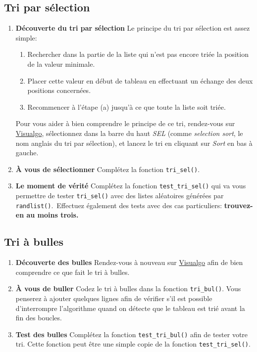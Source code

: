 \documentclass[11pt,a4paper]{article}
\newcommand{\checkbox}{$\square$ \smallskip}
\newcounter{exo} \setcounter{exo}{0}
\newenvironment{action}{%
    \begin{enumerate}[\numerotation] \addtocounter{exo}{-1}%
        }{%
    \end{enumerate}
}
\newcommand{\numexoa}{\theexo \addtocounter{exo}{1}}
\newcommand{\numerotation}{\checkbox \smallskip \numexoa.}
\begin{document}
\subsection*{Tri par sélection}
\begin{action}
\item {\bf Découverte du tri par sélection} Le principe du tri par sélection est assez simple:
\begin{enumerate}
  \item Rechercher dans la partie de la liste qui n'est pas encore triée la position de la valeur minimale.
  \item Placer cette valeur en début de tableau en effectuant un échange des deux positions concernées.
  \item Recommencer à l'étape (a) jusqu'à ce que toute la liste soit triée.
\end{enumerate}
Pour vous aider à bien comprendre le principe de ce tri, rendez-vous sur \href{https://visualgo.net/en/sorting}{Visualgo}, sélectionnez dans la barre du haut {\em SEL} (comme {\it selection sort}, le nom anglais du tri par sélection), et lancez le tri en cliquant sur {\em Sort} en bas à gauche.
\item {\bf À vous de sélectionner} Complétez la fonction {\tt tri\_sel()}.
\item {\bf Le moment de vérité} Complétez la fonction {\tt test\_tri\_sel()} qui va vous permettre de tester {\tt tri\_sel()} avec des listes aléatoires générées par {\tt randlist()}.\ 
Effectuez également des tests avec des cas particuliers: {\bf trouvez-en au moins trois.}
\end{action}

\subsection*{Tri à bulles}
\begin{action}
\item {\bf Découverte des bulles} Rendez-vous à nouveau sur \href{https://visualgo.net/en/sorting}{Visualgo} afin de bien comprendre ce que fait le tri à bulles.
\item {\bf À vous de buller} Codez le tri à bulles dans la fonction {\tt tri\_bul()}. Vous penserez à ajouter quelques lignes afin de vérifier s'il est possible d'interrompre l'algorithme quand on détecte que le tableau est trié avant la fin des boucles.
\item {\bf Test des bulles} Complétez la fonction {\tt test\_tri\_bul()} afin de tester votre tri. Cette fonction peut être une simple copie de la fonction {\tt test\_tri\_sel()}.
\end{action}
\end{document}
